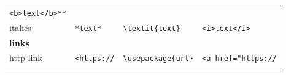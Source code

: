 \documentclass[10pt,fleqn]{wlpeerj}
\begin{document}
\begin{longtable}[]{@{}llll@{}}
\begin{minipage}[t]{0.26\columnwidth}
\texttt{\textless{}b\textgreater{}text\textless{}/b\textgreater{}**}\strut
\end{minipage}\tabularnewline
\begin{minipage}[t]{0.20\columnwidth}\raggedright\strut
italics\strut
\end{minipage}
&
\begin{minipage}[t]{0.18\columnwidth}\raggedright\strut
\texttt{*text*}\strut
\end{minipage}
&
\begin{minipage}[t]{0.25\columnwidth}\raggedright\strut
\texttt{\textbackslash{}textit\{text\}}\strut
\end{minipage}
&
\begin{minipage}[t]{0.26\columnwidth}\raggedright\strut
\texttt{\textless{}i\textgreater{}text\textless{}/i\textgreater{}}\strut
\end{minipage}\tabularnewline
\begin{minipage}[t]{0.20\columnwidth}\raggedright\strut
\textbf{links}\strut
\end{minipage}
&
\begin{minipage}[t]{0.18\columnwidth}\raggedright\strut
\strut
\end{minipage}
&
\begin{minipage}[t]{0.25\columnwidth}\raggedright\strut
\strut
\end{minipage}
&
\begin{minipage}[t]{0.26\columnwidth}\raggedright\strut
\strut
\end{minipage}\tabularnewline
\begin{minipage}[t]{0.20\columnwidth}\raggedright\strut
http
link\strut
\end{minipage}
&
\begin{minipage}[t]{0.18\columnwidth}\raggedright\strut
\texttt{\textless{}https://}\strut
\end{minipage}
&
\begin{minipage}[t]{0.25\columnwidth}\raggedright\strut
\texttt{\textbackslash{}usepackage\{url\}}\strut
\end{minipage}
&
\begin{minipage}[t]{0.26\columnwidth}\raggedright\strut
\texttt{\textless{}a\ href="https://}\strut
\end{minipage}\tabularnewline
\begin{minipage}[t]{0.20\columnwidth}\raggedright\strut
\strut
\end{minipage}
&
\begin{minipage}[t]{0.18\columnwidth}\raggedright\strut

\end{minipage}
\end{longtable}
\end{document}
